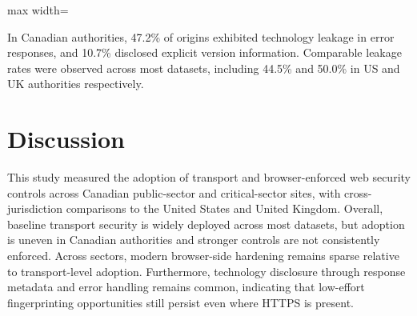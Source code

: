 \documentclass[conference]{IEEEtran}
\begin{document}
    \begin{table}[t]
      \caption{Information leakage in HTTP error responses by dataset.}
      \label{tab:error_leaks_summary}
      \centering
      \scriptsize
      \setlength{\tabcolsep}{4pt}
      \renewcommand{\arraystretch}{1.15}
      
      \begin{adjustbox}{max width=\columnwidth}
      \end{adjustbox}
    \end{table}
        

In Canadian authorities, 47.2\% of origins exhibited technology leakage in error responses, and 10.7\% disclosed explicit version information.
Comparable leakage rates were observed across most datasets, including 44.5\% and 50.0\% in US and UK authorities respectively.


\section{Discussion}\label{sec:discussion}


This study measured the adoption of transport and browser-enforced web security controls across Canadian public-sector and
critical-sector sites, with cross-jurisdiction comparisons to the United States and United Kingdom.
Overall, baseline transport security is widely deployed across most datasets, but
adoption is uneven in Canadian authorities and stronger controls are not consistently enforced.
Across sectors, modern browser-side hardening remains sparse relative to transport-level adoption. 
Furthermore, technology disclosure through response metadata and error handling remains common,
indicating that low-effort fingerprinting opportunities still persist even where HTTPS is present.
\end{document}
